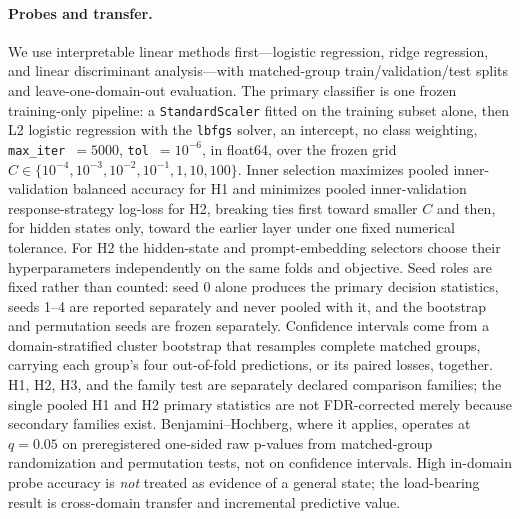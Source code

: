 \documentclass[11pt]{article}
\begin{document}
\paragraph{Probes and transfer.}
We use interpretable linear methods first---logistic regression, ridge regression,
and linear discriminant analysis---with matched-group train/validation/test splits
and leave-one-domain-out evaluation. The primary classifier is one frozen
training-only pipeline: a \texttt{StandardScaler} fitted on the training subset
alone, then L2 logistic regression with the \texttt{lbfgs} solver, an intercept, no
class weighting, \texttt{max\_iter}~$=5000$, \texttt{tol}~$=10^{-6}$, in float64,
over the frozen grid $C \in \{10^{-4}, 10^{-3}, 10^{-2}, 10^{-1}, 1, 10, 100\}$.
Inner selection maximizes pooled inner-validation balanced accuracy for H1 and
minimizes pooled inner-validation response-strategy log-loss for H2, breaking ties
first toward smaller $C$ and then, for hidden states only, toward the earlier layer
under one fixed numerical tolerance. For H2 the hidden-state and prompt-embedding
selectors choose their hyperparameters independently on the same folds and
objective. Seed roles are fixed rather than counted: seed 0 alone
produces the primary decision statistics, seeds 1--4 are reported separately and
never pooled with it, and the bootstrap and permutation seeds are frozen
separately. Confidence intervals come from a domain-stratified cluster bootstrap
that resamples complete matched groups, carrying each group's four out-of-fold
predictions, or its paired losses, together. H1, H2, H3, and the family test are
separately declared comparison families; the single pooled H1 and H2 primary
statistics are not FDR-corrected merely because secondary families exist.
Benjamini--Hochberg, where it applies, operates at $q = 0.05$ on preregistered
one-sided raw p-values from matched-group randomization and permutation tests, not
on confidence intervals. High in-domain probe accuracy is \emph{not} treated as
evidence of a general state; the load-bearing result is cross-domain transfer and
incremental predictive value.
\end{document}
